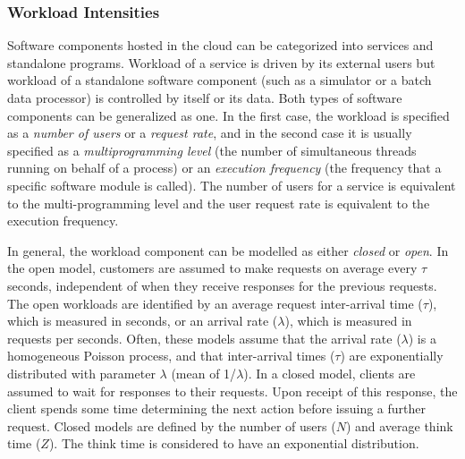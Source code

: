  \subsubsection{Workload  Intensities}  
 \label{sec:workload-intensities-background}  
 Software components hosted in the cloud can be categorized %
 into services and standalone programs. 
 Workload of a service is driven by its external users but workload of a standalone software component (such as a simulator or a batch data processor) is controlled by itself or its data.  
 Both types of software components can be generalized as one. 
 In the first case, the workload is specified as a \textit{number of users} or a \textit{request rate}, and in the second case it is usually specified as a \textit{multiprogramming level} (the number of simultaneous threads running on behalf of a process) or an \textit{execution frequency} (the frequency that a specific software module is called).   
 The number of users for a service is equivalent to the multi-programming level and the user request rate is equivalent to the execution frequency.
   
 In general, the workload component can be modelled as either {\it closed} or {\it open}. In the open model, customers are assumed to make requests on average every $\tau$ seconds, independent of when they receive responses for the previous requests. The open workloads are identified by an average request inter-arrival time ($\tau$), which is measured in seconds, or an arrival rate ($\lambda$), which is measured in requests per seconds. Often, these models assume that the arrival rate ($\lambda $) is a homogeneous Poisson process, and that inter-arrival times ($\tau $) are exponentially distributed with parameter $\lambda $ (mean of 1/$\lambda $).  
In a closed model, clients are assumed to wait for responses to their requests.  Upon receipt of this response, the client spends some time determining the next action before issuing a further request. Closed models are defined by the number of users ($N$) and average think time ($Z$). The think time is considered to have an exponential distribution.

